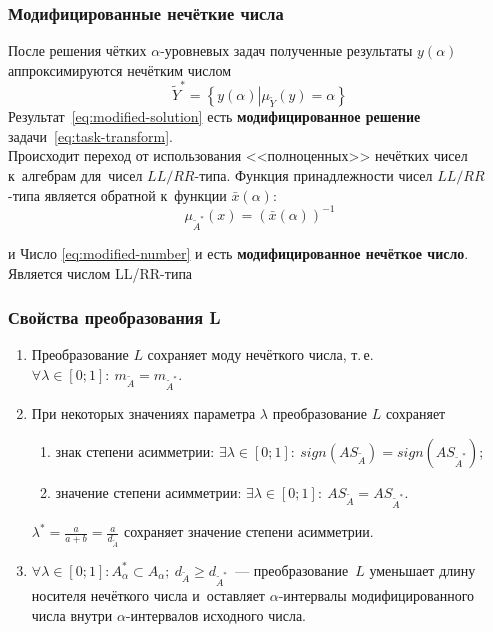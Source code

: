 \documentclass[12pt]{beamer}
\begin{document}
\begin{frame}
  \frametitle{Модифицированные нечёткие числа}
  После решения чётких $\alpha $-уровневых задач полученные результаты $y\left( \alpha  \right)$ аппроксимируются нечётким числом 
  \begin{equation}
    \label{eq:modified-solution}
    \tilde Y^{*}=\left\{ y(\alpha )\left| \mu_{\tilde Y}(y)=\alpha \right. \right\}  
  \end{equation}
  Результат~\eqref{eq:modified-solution} есть \textbf{модифицированное решение} задачи~\eqref{eq:task-transform}.\\
Происходит переход от использования <<полноценных>> нечётких чисел к~алгебрам для~чисел $LL/RR$-типа. Функция принадлежности чисел $LL/RR$-типа является обратной к~функции $\bar{x}\left(\alpha \right)$:
\begin{equation}
  \label{eq:modified-number}
  \mu_{\tilde A^{*}}\left( x \right)={\left( \bar{x}\left( \alpha  \right) \right)}^{-1}
\end{equation}

и Число \eqref{eq:modified-number} и есть \textbf{модифицированное нечёткое число}. Является числом LL/RR-типа
\end{frame}

\begin{frame}
  \frametitle{Свойства преобразования L}
  \begin{enumerate}
    \item Преобразование $L$ сохраняет моду нечёткого числа, т.\,е. $\forall \lambda \in \left[ 0;1 \right]:\ m_{\tilde A}=m_{\tilde A^{*}}$.
    \item При некоторых значениях параметра $\lambda$ преобразование $L$ сохраняет
      \begin{enumerate}
        \item знак степени асимметрии: $\exists \lambda \in [0;1]:\ sign(AS_{\tilde A})=sign(AS_{\tilde A^{*}})$;
        \item значение степени асимметрии: $\exists \lambda \in [0;1]:\ AS_{\tilde A}=AS_{\tilde A^{*}}$.
      \end{enumerate}
      $\displaystyle \lambda^* =\frac{a}{a+b}=\frac{a}{d_{\tilde A}}$ сохраняет значение степени асимметрии.
    \item $\forall \lambda \in \left[ 0;1 \right]: A_{\alpha}^{*}\subset A_\alpha;\ d_{\tilde A} \geqslant d_{\tilde A^{*}}$~--- преобразование~$L$ уменьшает длину носителя нечёткого числа и~оставляет $\alpha$-интервалы модифицированного числа внутри $\alpha$-интервалов исходного числа.
  \end{enumerate}
\end{frame}
\end{document}
